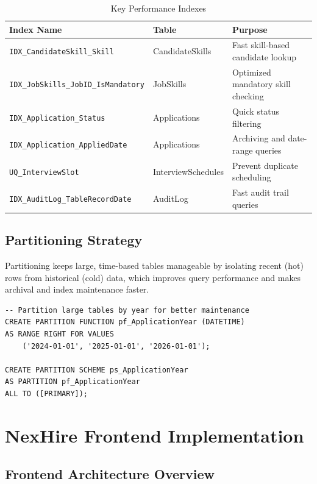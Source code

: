 \documentclass[11pt,a4paper]{article}
\begin{document}
\begin{table}[H]
    \centering
    \begin{tabular}{|l|l|p{8cm}|}
        \hline
        \rowcolor{tableheader}
        \textbf{Index Name} & \textbf{Table} & \textbf{Purpose} \\
        \hline
        \texttt{IDX\_CandidateSkill\_Skill} & CandidateSkills & Fast skill-based candidate lookup \\
        \hline
        \texttt{IDX\_JobSkills\_JobID\_IsMandatory} & JobSkills & Optimized mandatory skill checking \\
        \hline
        \texttt{IDX\_Application\_Status} & Applications & Quick status filtering \\
        \hline
        \texttt{IDX\_Application\_AppliedDate} & Applications & Archiving and date-range queries \\
        \hline
        \texttt{UQ\_InterviewSlot} & InterviewSchedules & Prevent duplicate scheduling \\
        \hline
        \texttt{IDX\_AuditLog\_TableRecordDate} & AuditLog & Fast audit trail queries \\
        \hline
    \end{tabular}
    \caption{Key Performance Indexes}
\end{table}

\subsection{Partitioning Strategy}
\noindent
Partitioning keeps large, time-based tables manageable by isolating recent (hot) rows from historical (cold) data, which improves query performance and makes archival and index maintenance faster.

\begin{verbatim}
-- Partition large tables by year for better maintenance
CREATE PARTITION FUNCTION pf_ApplicationYear (DATETIME)
AS RANGE RIGHT FOR VALUES 
    ('2024-01-01', '2025-01-01', '2026-01-01');

CREATE PARTITION SCHEME ps_ApplicationYear
AS PARTITION pf_ApplicationYear
ALL TO ([PRIMARY]);
\end{verbatim}

\section{NexHire Frontend Implementation}
\subsection{Frontend Architecture Overview}
\end{document}
